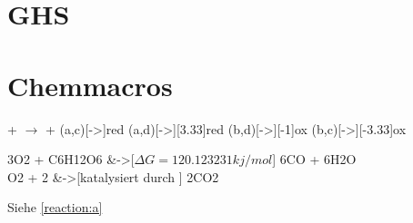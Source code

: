 \documentclass{classes/report}
\begin{document}
\section{GHS}
\section{Chemmacros}
     \par
     \par
     \par
    
    \vspace{14mm}
     +  $\rightarrow$  + 
    \redox(a,c)[->]{red}
    \redox(a,d)[->][3.33]{red}
    \redox(b,d)[->][-1]{ox}
    \redox(b,c)[->][-3.33]{ox}
    
    \vspace{14mm} 
    
    \begin{reactions}
        3O2 + C6H12O6 &->[$\Delta G = \num{120.123231}\si{kj/mol}$] 6CO + 6H2O  \label{reaction:a}\\
        O2 + 2 &->[katalysiert durch ] 2CO2 
    \end{reactions} 
    Siehe \ref{reaction:a}
  
\end{document}
